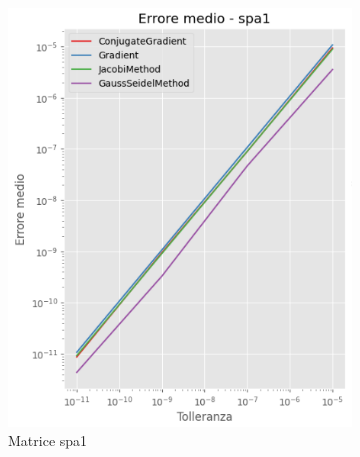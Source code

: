 \begin{figure}[!ht]
    \centering
    \begin{subfigure}{0.45\textwidth}
        \centering
        \includegraphics[width=\textwidth]{./../report/Progetto_1_bis/img/error_spa1.png}
        \caption{Matrice spa1}
        \label{fig:error_spa1}
    \end{subfigure}
    \begin{subfigure}{0.45\textwidth}
        \centering

\end{subfigure}
\end{figure}
